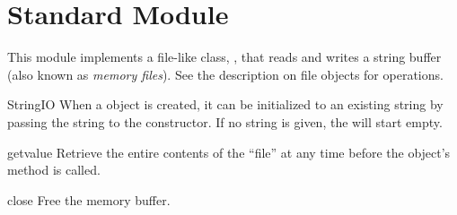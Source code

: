 \section{Standard Module }
\label{module-StringIO}


This module implements a file-like class, ,
that reads and writes a string buffer (also known as \emph{memory
files}). See the description on file objects for operations.

\begin{classdesc}{StringIO}{}
When a  object is created, it can be initialized
to an existing string by passing the string to the constructor.
If no string is given, the  will start empty.
\end{classdesc}

\begin{methoddesc}{getvalue}{}
Retrieve the entire contents of the ``file'' at any time before the
 object's  method is called.
\end{methoddesc}

\begin{methoddesc}{close}{}
Free the memory buffer.
\end{methoddesc}
